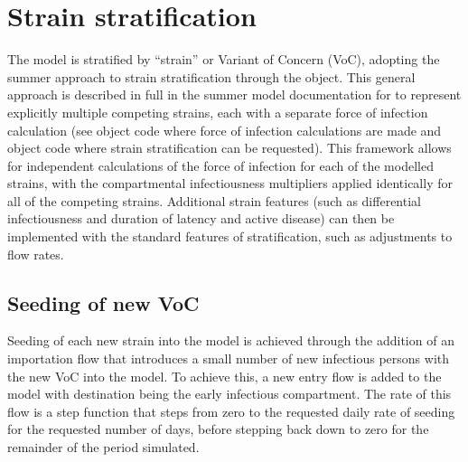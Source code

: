 \section{Strain stratification} \label{strain}
The model is stratified by ``strain'' or Variant of Concern (VoC),
adopting the summer approach to strain stratification through the  object.
This general approach is described in full in the summer model documentation for to represent explicitly multiple competing strains,
each with a separate force of infection calculation (see  object code where force of infection calculations are made and
 object code where strain stratification can be requested).
This framework allows for independent calculations of the force of infection for each of the modelled strains,
with the compartmental infectiousness multipliers applied identically for all of the competing strains.
Additional strain features (such as differential infectiousness and duration of latency and active disease)
can then be implemented with the standard features of stratification,
such as adjustments to flow rates.

\subsection{Seeding of new VoC}
Seeding of each new strain into the model is achieved through the addition of an importation flow
that introduces a small number of new infectious persons with the new VoC into the model.
To achieve this, a new entry flow is added to the model with destination being the early infectious compartment.
The rate of this flow is a step function that steps from zero to the requested daily rate of seeding for the requested number of days,
before stepping back down to zero for the remainder of the period simulated.